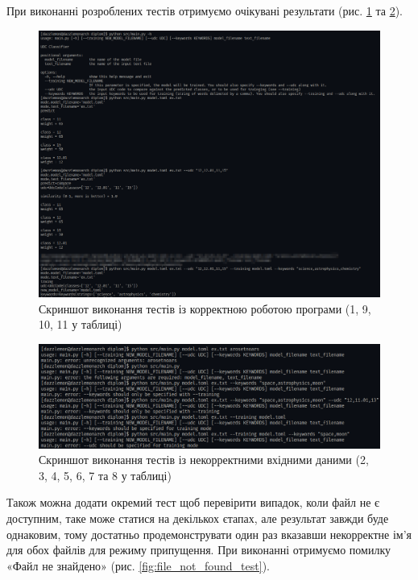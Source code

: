 \documentclass[14pt]{extarticle}
\begin{document}
  При виконанні розроблених тестів отримуємо очікувані результати
  (рис. \ref{fig:correct_tests} та \ref{fig:error_tests}).

  \begin{figure}[H]
    \centering
    \includegraphics[width=\linewidth]{correct_tests.png}    
    \captionsetup{justification=centering}  
    \caption{Скриншот виконання тестів із корректною роботою програми (1, 9, 10, 11 у таблиці)}
    \label{fig:correct_tests}
  \end{figure}

  \begin{figure}[H]
    \centering
    \includegraphics[width=\linewidth]{error_tests.png}    
    \captionsetup{justification=centering}  
    \caption{Скриншот виконання тестів із некорректними вхідними даними (2, 3, 4, 5, 6, 7 та 8 у таблиці)}
    \label{fig:error_tests}
  \end{figure}

  Також можна додати окремий тест щоб перевірити випадок,
  коли файл не є доступним, таке може статися на декількох єтапах,
  але результат завжди буде однаковим,
  тому достатньо продемонструвати один раз
  вказавши некорректне ім'я для обох файлів для режиму припущення.
  При виконанні отримуємо помилку «Файл не знайдено»
  (рис. \ref{fig:file_not_found_test}).
\end{document}
